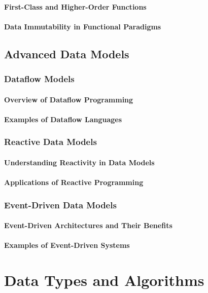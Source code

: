 \documentclass[12pt, oneside]{book}
\begin{document}
\subsubsection{First-Class and Higher-Order Functions}
\subsubsection{Data Immutability in Functional Paradigms}
\section{Advanced Data Models}
\subsection{Dataflow Models}
\subsubsection{Overview of Dataflow Programming}
\subsubsection{Examples of Dataflow Languages}
\subsection{Reactive Data Models}
\subsubsection{Understanding Reactivity in Data Models}
\subsubsection{Applications of Reactive Programming}
\subsection{Event-Driven Data Models}
\subsubsection{Event-Driven Architectures and Their Benefits}
\subsubsection{Examples of Event-Driven Systems}

\chapter{Data Types and Algorithms}
\end{document}

